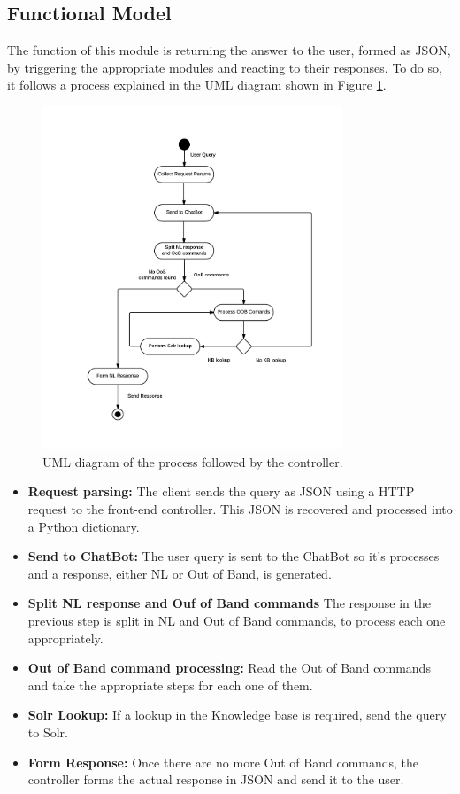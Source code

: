 \subsection{Functional Model}
\label{subsec:functmodel}

The function of this module is returning the answer to the user, formed as JSON, by triggering the appropriate modules and reacting to their responses. To do so, it follows a process explained in the UML diagram shown in Figure \ref{fig:fe-model1}.

\begin{figure}[!htbp]
    \centering
    \includegraphics[width=0.8\textwidth]{img/prot/activityDiagram.png} 
    \caption{UML diagram of the process followed by the controller.}
    \label{fig:fe-model1}
\end{figure}

\begin{itemize}
 \item \textbf{Request parsing:} The client sends the query as JSON using a HTTP request to the front-end controller. This JSON is recovered and processed into a Python dictionary.
 \item \textbf{Send to ChatBot:} The user query is sent to the ChatBot so it's processes and a response, either \ac{NL} or Out of Band, is generated.
 \item \textbf{Split \ac{NL} response and Ouf of Band commands} The response in the previous step is split in \ac{NL} and Out of Band commands, to process each one appropriately.
 \item \textbf{Out of Band command processing:} Read the Out of Band commands and take the appropriate steps for each one of them.
 \item \textbf{Solr Lookup:} If a lookup in the Knowledge base is required, send the query to Solr.
 \item \textbf{Form Response:} Once there are no more Out of Band  commands, the controller forms the actual response in JSON and send it to the user.
\end{itemize}

